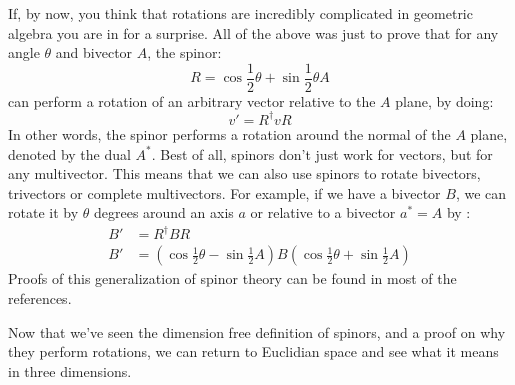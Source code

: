 \documentclass[10pt]{report}
\begin{document}
If, by now, you think that rotations are incredibly complicated in
geometric algebra you are in for a surprise. All of the above was
just to prove that for any angle $\theta$ and bivector $A$, the
spinor:
\begin{displaymath}
    R = \cos \frac{1}{2}\theta + \sin \frac{1}{2}\theta A
\end{displaymath}
can perform a rotation of an arbitrary vector relative to the $A$
plane, by doing:
\begin{displaymath}
    v' = R^\dagger vR
\end{displaymath}
In other words, the spinor performs a rotation around the normal
of the $A$ plane, denoted by the dual $A^*$. Best of all, spinors
don't just work for vectors, but for any multivector. This means
that we can also use spinors to rotate bivectors, trivectors or
complete multivectors. For example, if we have a bivector $B$, we
can rotate it by $\theta$ degrees around an axis $a$ or relative
to a bivector $a^* = A$ by :
\begin{align*}
    B' &= R^\dagger BR   \\
    B' &= (\cos\frac{1}{2}\theta - \sin\frac{1}{2}A)B(\cos\frac{1}{2}\theta + \sin\frac{1}{2}A)
\end{align*}
Proofs of this generalization of spinor theory can be found in
most of the references.

Now that we've seen the dimension free definition of spinors, and
a proof on why they perform rotations, we can return to Euclidian
space and see what it means in three dimensions.
\end{document}
